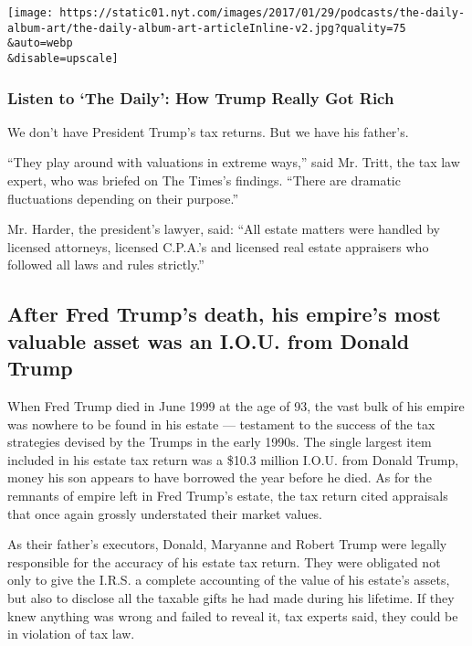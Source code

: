 \texttt{[image: https://static01.nyt.com/images/2017/01/29/podcasts/the-daily-album-art/the-daily-album-art-articleInline-v2.jpg?quality=75\\\&auto=webp\\\&disable=upscale]}

\hypertarget{listen-to-the-daily-how-trump-really-got-rich}{%
\subsubsection{Listen to `The Daily': How Trump Really Got
Rich}\label{listen-to-the-daily-how-trump-really-got-rich}}

We don't have President Trump's tax returns. But we have his father's.

``They play around with valuations in extreme ways,'' said Mr. Tritt,
the tax law expert, who was briefed on The Times's findings. ``There are
dramatic fluctuations depending on their purpose.''

Mr. Harder, the president's lawyer, said: ``All estate matters were
handled by licensed attorneys, licensed C.P.A.'s and licensed real
estate appraisers who followed all laws and rules strictly.''

\hypertarget{after-fred-trumps-death-his-empires-most-valuable-asset-was-an-iou-from-donald-trump}{%
\subsection{After Fred Trump's death, his empire's most valuable asset
was an I.O.U. from Donald
Trump}\label{after-fred-trumps-death-his-empires-most-valuable-asset-was-an-iou-from-donald-trump}}

When Fred Trump died in June 1999 at the age of 93, the vast bulk of his
empire was nowhere to be found in his estate --- testament to the
success of the tax strategies devised by the Trumps in the early 1990s.
The single largest item included in his estate tax return was a \$10.3
million I.O.U. from Donald Trump, money his son appears to have borrowed
the year before he died. As for the remnants of empire left in Fred
Trump's estate, the tax return cited appraisals that once again grossly
understated their market values.

As their father's executors, Donald, Maryanne and Robert Trump were
legally responsible for the accuracy of his estate tax return. They were
obligated not only to give the I.R.S. a complete accounting of the value
of his estate's assets, but also to disclose all the taxable gifts he
had made during his lifetime. If they knew anything was wrong and failed
to reveal it, tax experts said, they could be in violation of tax law.

